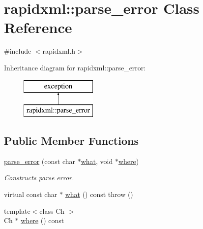 \hypertarget{classrapidxml_1_1parse__error}{\section{rapidxml\+:\+:parse\+\_\+error Class Reference}
\label{classrapidxml_1_1parse__error}
}


{\ttfamily \#include $<$rapidxml.\+h$>$}

Inheritance diagram for rapidxml\+:\+:parse\+\_\+error\+:\begin{figure}[H]
\begin{center}
\leavevmode
\includegraphics[height=2.000000cm]{classrapidxml_1_1parse__error}
\end{center}
\end{figure}
\subsection*{Public Member Functions}
\begin{DoxyCompactItemize}
\item 
\hypertarget{classrapidxml_1_1parse__error_aea12a301271c393fb627b368fb9f35c1}{\hyperlink{classrapidxml_1_1parse__error_aea12a301271c393fb627b368fb9f35c1}{parse\+\_\+error} (const char $\ast$\hyperlink{classrapidxml_1_1parse__error_a7665c88639e7466ee1de388a4f85e6fe}{what}, void $\ast$\hyperlink{classrapidxml_1_1parse__error_a3a0ab9e586c1d2b437c340f6622fbec6}{where})}\label{classrapidxml_1_1parse__error_aea12a301271c393fb627b368fb9f35c1}

\begin{DoxyCompactList}\small\item\em Constructs parse error. \end{DoxyCompactList}\item 
virtual const char $\ast$ \hyperlink{classrapidxml_1_1parse__error_a7665c88639e7466ee1de388a4f85e6fe}{what} () const   throw ()
\item 
{\footnotesize template$<$class Ch $>$ }\\Ch $\ast$ \hyperlink{classrapidxml_1_1parse__error_a3a0ab9e586c1d2b437c340f6622fbec6}{where} () const 
\end{DoxyCompactItemize}


